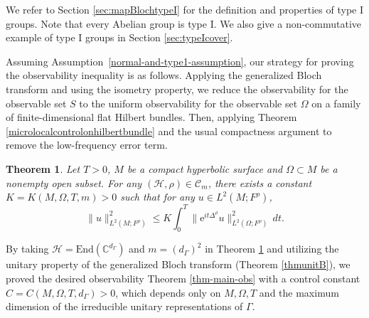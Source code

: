 \documentclass[11pt,oneside,reqno]{amsart}
\newtheorem{theorem}{Theorem}[section]
\theoremstyle{definition}
\numberwithin{equation}{section}
\theoremstyle{plain}
\begin{document}
We refer to Section \ref{sec:mapBlochtypeI} for the definition and properties of type I groups. Note that every Abelian group is type I. We also give a non-commutative example of type I groups in Section \ref{sec:typeIcover}.

Assuming Assumption~\ref{normal-and-type1-assumption}, our strategy for proving the observability inequality is as follows. Applying the generalized Bloch transform and using the isometry property, we reduce the observability for the observable set $S$ to the uniform observability for the observable set $\Omega$ on a family of finite-dimensional flat Hilbert bundles. Then, applying Theorem \ref{microlocalcontrolonhilbertbundle} and the usual compactness argument to remove the low-frequency error term.




\begin{theorem}\label{thm-uniform-obs}
 Let $T>0$, $M$ be a compact hyperbolic surface and $\Omega \subset M$ be a nonempty open subset. For any $(\mathcal{H},\rho) \in \mathcal{C}_m$, there exists a constant $K=K(M, \Omega, T, m)>0$ such that for any $u \in L^2(M;F^{\rho})$, 
\begin{equation}\label{eqn-obs}
\|u\|_{L^2(M;F^{\rho})}^2 \leq K\int_{0}^{T}\|\mathrm{e}^{it \Delta^{\rho}}u\|^2_{L^2(\Omega;F^{\rho})} \, dt. 
\end{equation}
\end{theorem}


By taking $\mathcal{H}=\mathrm{End}(\mathbb{C}^{d_\Gamma})$ and $m=(d_\Gamma)^2$ in Theorem \ref{thm-uniform-obs} and utilizing the unitary property of the generalized Bloch transform (Theorem \ref{thmunitB}), we proved the desired observability Theorem \ref{thm-main-obs} with a control constant $C=C(M,\Omega,T,d_\Gamma)>0$, which depends only on $M,\Omega,T$ and the maximum dimension of the irreducible unitary representations of $\Gamma$.
\end{document}
